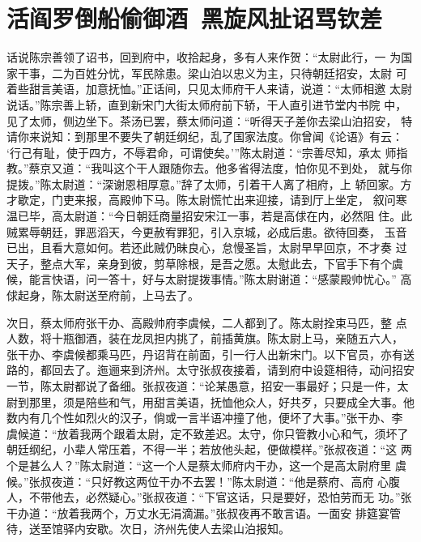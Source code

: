 \chapter{活阎罗倒船偷御酒~黑旋风扯诏骂钦差}

话说陈宗善领了诏书，回到府中，收拾起身，多有人来作贺：“太尉此行，一
为国家干事，二为百姓分忧，军民除患。梁山泊以忠义为主，只待朝廷招安，太尉
可着些甜言美语，加意抚恤。”正话间，只见太师府干人来请，说道：“太师相邀
太尉说话。”陈宗善上轿，直到新宋门大街太师府前下轿，干人直引进节堂内书院
中，见了太师，侧边坐下。茶汤已罢，蔡太师问道：“听得天子差你去梁山泊招安，
特请你来说知：到那里不要失了朝廷纲纪，乱了国家法度。你曾闻《论语》有云：
‘行己有耻，使于四方，不辱君命，可谓使矣。’”陈太尉道：“宗善尽知，承太
师指教。”蔡京又道：“我叫这个干人跟随你去。他多省得法度，怕你见不到处，
就与你提拨。”陈太尉道：“深谢恩相厚意。”辞了太师，引着干人离了相府，上
轿回家。方才歇定，门吏来报，高殿帅下马。陈太尉慌忙出来迎接，请到厅上坐定，
叙问寒温已毕，高太尉道：“今日朝廷商量招安宋江一事，若是高俅在内，必然阻
住。此贼累辱朝廷，罪恶滔天，今更赦宥罪犯，引入京城，必成后患。欲待回奏，
玉音已出，且看大意如何。若还此贼仍昧良心，怠慢圣旨，太尉早早回京，不才奏
过天子，整点大军，亲身到彼，剪草除根，是吾之愿。太慰此去，下官手下有个虞
候，能言快语，问一答十，好与太尉提拨事情。”陈太尉谢道：“感蒙殿帅忧心。”
高俅起身，陈太尉送至府前，上马去了。

次日，蔡太师府张干办、高殿帅府李虞候，二人都到了。陈太尉拴束马匹，整
点人数，将十瓶御酒，装在龙凤担内挑了，前插黄旗。陈太尉上马，亲随五六人，
张干办、李虞候都乘马匹，丹诏背在前面，引一行人出新宋门。以下官员，亦有送
路的，都回去了。迤逦来到济州。太守张叔夜接着，请到府中设筵相待，动问招安
一节，陈太尉都说了备细。张叔夜道：“论某愚意，招安一事最好；只是一件，太
尉到那里，须是陪些和气，用甜言美语，抚恤他众人，好共歹，只要成全大事。他
数内有几个性如烈火的汉子，倘或一言半语冲撞了他，便坏了大事。”张干办、李
虞候道：“放着我两个跟着太尉，定不致差迟。太守，你只管教小心和气，须坏了
朝廷纲纪，小辈人常压着，不得一半；若放他头起，便做模样。”张叔夜道：“这
两个是甚么人？”陈太尉道：“这一个人是蔡太师府内干办，这一个是高太尉府里
虞候。”张叔夜道：“只好教这两位干办不去罢！”陈太尉道：“他是蔡府、高府
心腹人，不带他去，必然疑心。”张叔夜道：“下官这话，只是要好，恐怕劳而无
功。”张干办道：“放着我两个，万丈水无涓滴漏。”张叔夜再不敢言语。一面安
排筵宴管待，送至馆驿内安歇。次日，济州先使人去梁山泊报知。


